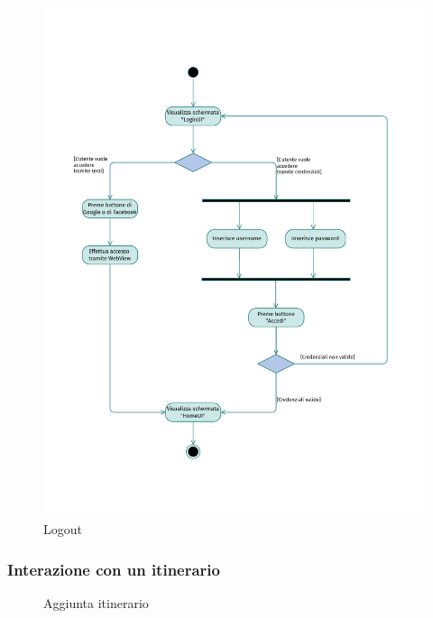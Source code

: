 \documentclass{natourDoc}
\begin{document}
\newpage
\begin{figure}[!htbp]
	\centering
	\includegraphics[width=\textwidth, page=16]{./diagrams/activity.pdf}
	\caption{Logout}
\end{figure}
\FloatBarrier


\newpage
\subsubsection{Interazione con un itinerario}
\begin{figure}[!htbp]
	\centering
	
	\caption{Aggiunta itinerario}
\end{figure}
\FloatBarrier
\end{document}
